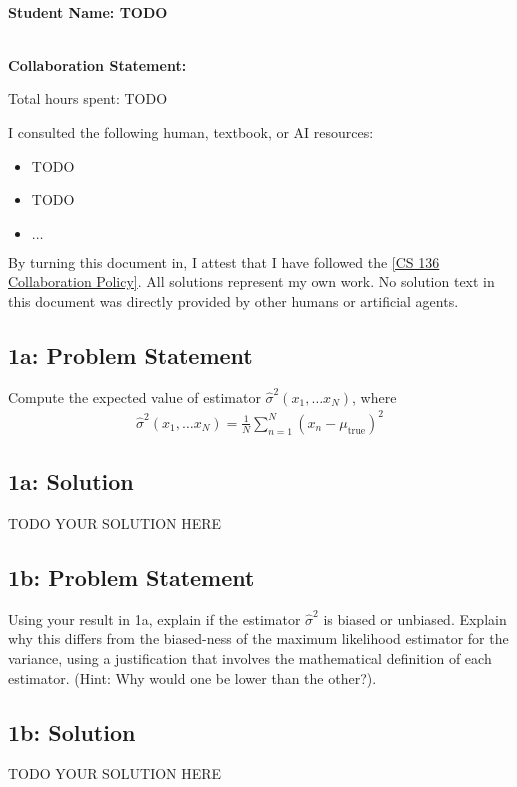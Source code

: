 \documentclass[10pt]{article}
\newcommand{\officialdirections}[1]{{\color{purple} #1}}
\begin{document}
~\\ %
{\Large{\bf Student Name: TODO}}

~\\ %
{\bf Collaboration Statement:}

Total hours spent: TODO

I consulted the following human, textbook, or AI resources:
\begin{itemize}
\item TODO
\item TODO
\item $\ldots$	
\end{itemize}

By turning this document in, I attest that I have followed the 
\href{https://www.cs.tufts.edu/cs/136/2025f/index.html#collaboration}{[CS 136 Collaboration Policy]}. All solutions represent my own work. No solution text in this document was directly provided by other humans or artificial agents. 

\tableofcontents

\newpage

\officialdirections{
\subsection*{1a: Problem Statement}
Compute the expected value of estimator $\hat{\sigma}^2(x_1, \ldots x_N)$, where
\begin{align}
\hat{\sigma}^2(x_1, \ldots x_N) = \frac{1}{N} \sum_{n=1}^N (x_n - \mu_{\text{true}})^2
\end{align}
}

\subsection{1a: Solution}
TODO YOUR SOLUTION HERE

\officialdirections{
\subsection*{1b: Problem Statement}
Using your result in 1a, explain if the estimator $\hat{\sigma}^2$ is biased or unbiased. Explain why this differs from the biased-ness of the maximum likelihood estimator for the variance, using a justification that involves the mathematical definition of each estimator. (Hint: Why would one be lower than the other?).
}

\subsection{1b: Solution}
TODO YOUR SOLUTION HERE
\end{document}
